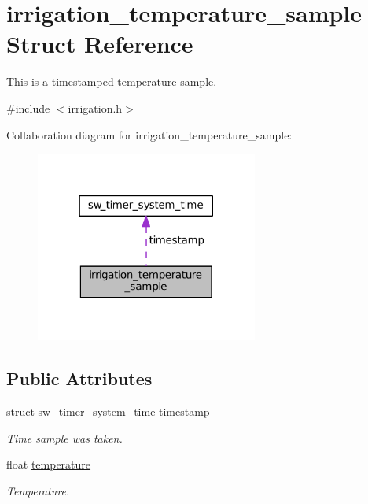 \hypertarget{structirrigation__temperature__sample}{}\section{irrigation\+\_\+temperature\+\_\+sample Struct Reference}
\label{structirrigation__temperature__sample}


This is a timestamped temperature sample.  




{\ttfamily \#include $<$irrigation.\+h$>$}



Collaboration diagram for irrigation\+\_\+temperature\+\_\+sample\+:\nopagebreak
\begin{figure}[H]
\begin{center}
\leavevmode
\includegraphics[width=207pt]{structirrigation__temperature__sample__coll__graph}
\end{center}
\end{figure}
\subsection*{Public Attributes}
\begin{DoxyCompactItemize}
\item 
struct \hyperlink{structsw__timer__system__time}{sw\+\_\+timer\+\_\+system\+\_\+time} \hyperlink{structirrigation__temperature__sample_aa10fbbf9f10f89fc9f246f42c26b0ad2}{timestamp}
\begin{DoxyCompactList}\small\item\em Time sample was taken. \end{DoxyCompactList}\item 
float \hyperlink{structirrigation__temperature__sample_ae72c8bc3c16a24366685eecbf9493a2e}{temperature}
\begin{DoxyCompactList}\small\item\em Temperature. \end{DoxyCompactList}\end{DoxyCompactItemize}


